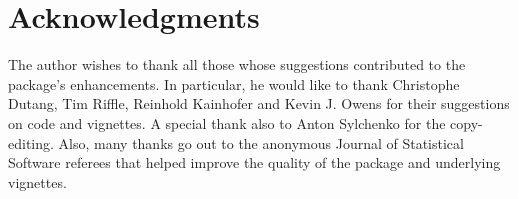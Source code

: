 \documentclass[nojss]{jss}
\begin{document}
\section*{Acknowledgments}\label{sec:acknowledgments}

The author wishes to thank all those whose suggestions contributed to
the package's enhancements. In particular, he would like to thank
Christophe Dutang, Tim Riffle, Reinhold Kainhofer and Kevin J. Owens for their
suggestions on code and vignettes. A special thank also to Anton Sylchenko for the
copy-editing. Also, many thanks go out to the anonymous Journal of
Statistical Software referees that helped improve the quality of the
package and underlying vignettes.

%

\end{document}
